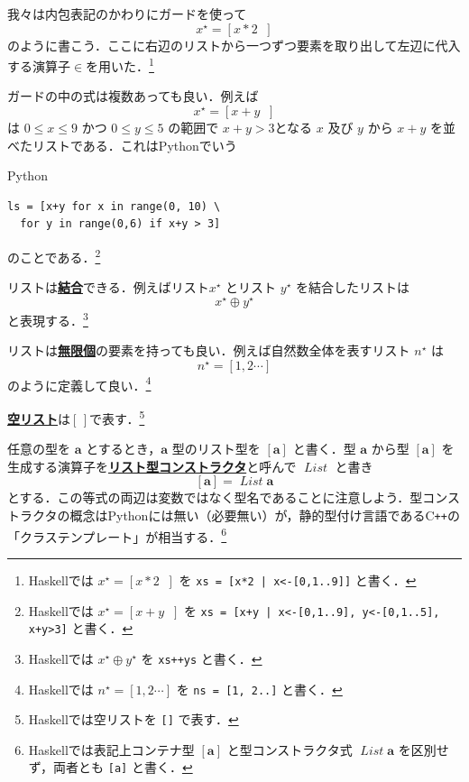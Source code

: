 \documentclass[a4paper,twocolumn]{jsbook}
\newcommand{\programminglanguage}[1]{\textsf{#1}}
\newcommand{\cxx}{\programminglanguage{C}\texttt{++}}
\newcommand{\haskell}{\programminglanguage{Haskell}}
\newcommand{\python}{\programminglanguage{Python}}
\newcommand{\keyword}[1]{{\underline{\textbf{#1}}}}
\newcommand{\code}[1]{\texttt{#1}}
\newenvironment{pythoncode}{\begin{itembox}[r]{\python}}{\end{itembox}}
\newcommand{\mEmptyList}{{[\,]}}
\DeclareMathOperator{\mAppend}{\oplus}
\DeclareMathOperator{\mFrom}{\in}
\newcommand{\mType}[1]{\mathbf{#1}}
\newcommand{\mListWith}[1]{\left[#1\right]}
\newcommand{\mListType}[1]{\mListWith{\mType{#1}}}
\newcommand{\mTypeConstructor}[1]{\mathit{#1}} %
\DeclareMathOperator{\mListTypeConstructor}{\mTypeConstructor{List}}
\newcommand{\mList}[1]{{#1}^\mathrm{\star}}
\newcommand{\mListGuard}[1]{\mathop{\mid_{#1}}}
\begin{document}
我々は内包表記のかわりにガードを使って
\begin{equation}
\mList{x}=\mListWith{x*2\mListGuard{x\mFrom{\mListWith{0,1\dotsb9}}}}
\end{equation}
のように書こう．ここに右辺のリストから一つずつ要素を取り出して左辺に代入する演算子$\mFrom$を用いた．\footnote{\haskell では $\mList{x}=\mListWith{x*2\mListGuard{x\mFrom{\mListWith{0,1\dotsb9}}}}$ を \code{xs = [x*2 | x<-[0,1..9]]} と書く．}

ガードの中の式は複数あっても良い．例えば
\begin{equation}
\mList{x}
=\mListWith{x+y\mListGuard{x\mFrom\mListWith{0,1\dotsb9},\,y\mFrom\mListWith{0,1\dotsb5},\,x+y>3}}
\end{equation}
は $0\le x\le9$ かつ $0\le y\le5$ の範囲で $x+y>3$となる $x$ 及び $y$ から $x+y$ を並べたリストである．これは\python でいう
\begin{pythoncode}
\begin{verbatim}
ls = [x+y for x in range(0, 10) \
  for y in range(0,6) if x+y > 3]
\end{verbatim}
\end{pythoncode}
のことである．\footnote{\haskell では $\mList{x}=\mListWith{x+y\mListGuard{x\mFrom\mListWith{0,1\dotsb9},\,y\mFrom\mListWith{0,1\dotsb5},\,x+y>3}}$ を \code{xs = [x+y | x<-[0,1..9], y<-[0,1..5], x+y>3]} と書く．}

リストは\keyword{結合}できる．例えばリスト$\mList{x}$ とリスト $\mList{y}$ を結合したリストは
\begin{equation}
\mList{x}\mAppend\mList{y}
\end{equation}
と表現する．\footnote{\haskell では $\mList{x}\mAppend\mList{y}$ を \code{xs++ys} と書く．}

リストは\keyword{無限個}の要素を持っても良い．例えば自然数全体を表すリスト $\mList{n}$ は
\begin{equation}
\mList{n}=\mListWith{1,2\dotsb}
\end{equation}
のように定義して良い．\footnote{\haskell では $\mList{n}=\mListWith{1,2\dotsb}$ を \code{ns = [1, 2..]} と書く．}

\keyword{空リスト}は$\mEmptyList$で表す．\footnote{\haskell では空リストを \code{[]} で表す．}

任意の型を $\mType{a}$ とするとき，$\mType{a}$ 型のリスト型を $\mListType{a}$ と書く．型 $\mType{a}$ から型 $\mListType{a}$ を生成する演算子を\keyword{リスト型コンストラクタ}と呼んで $\mListTypeConstructor$ と書き
\begin{equation}
\mListType{a}=\mListTypeConstructor\mType{a}
\end{equation}
とする．この等式の両辺は変数ではなく型名であることに注意しよう．型コンストラクタの概念は\python には無い（必要無い）が，静的型付け言語である\cxx の「クラステンプレート」が相当する．\footnote{\haskell では表記上コンテナ型 $\mListType{a}$ と型コンストラクタ式 $\mListTypeConstructor\mType{a}$ を区別せず，両者とも \code{[a]} と書く．}
\end{document}

